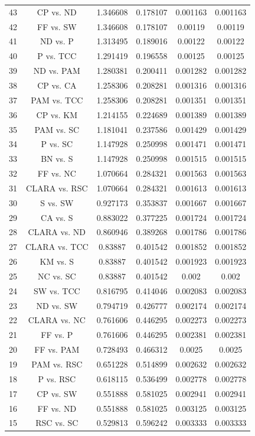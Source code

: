 \documentclass[a4paper,10pt]{article}
\begin{document}
\begin{landscape}
\begin{table}[!htp]
\begin{tabular}{cccccc}
43&CP vs. ND&1.346608&0.178107&0.001163&0.001163\\
42&FF vs. SW&1.346608&0.178107&0.00119&0.00119\\
41&ND vs. P&1.313495&0.189016&0.00122&0.00122\\
40&P vs. TCC&1.291419&0.196558&0.00125&0.00125\\
39&ND vs. PAM&1.280381&0.200411&0.001282&0.001282\\
38&CP vs. CA&1.258306&0.208281&0.001316&0.001316\\
37&PAM vs. TCC&1.258306&0.208281&0.001351&0.001351\\
36&CP vs. KM&1.214155&0.224689&0.001389&0.001389\\
35&PAM vs. SC&1.181041&0.237586&0.001429&0.001429\\
34&P vs. SC&1.147928&0.250998&0.001471&0.001471\\
33&BN vs. S&1.147928&0.250998&0.001515&0.001515\\
32&FF vs. NC&1.070664&0.284321&0.001563&0.001563\\
31&CLARA vs. RSC&1.070664&0.284321&0.001613&0.001613\\
30&S vs. SW&0.927173&0.353837&0.001667&0.001667\\
29&CA vs. S&0.883022&0.377225&0.001724&0.001724\\
28&CLARA vs. ND&0.860946&0.389268&0.001786&0.001786\\
27&CLARA vs. TCC&0.83887&0.401542&0.001852&0.001852\\
26&KM vs. S&0.83887&0.401542&0.001923&0.001923\\
25&NC vs. SC&0.83887&0.401542&0.002&0.002\\
24&SW vs. TCC&0.816795&0.414046&0.002083&0.002083\\
23&ND vs. SW&0.794719&0.426777&0.002174&0.002174\\
22&CLARA vs. NC&0.761606&0.446295&0.002273&0.002273\\
21&FF vs. P&0.761606&0.446295&0.002381&0.002381\\
20&FF vs. PAM&0.728493&0.466312&0.0025&0.0025\\
19&PAM vs. RSC&0.651228&0.514899&0.002632&0.002632\\
18&P vs. RSC&0.618115&0.536499&0.002778&0.002778\\
17&CP vs. SW&0.551888&0.581025&0.002941&0.002941\\
16&FF vs. ND&0.551888&0.581025&0.003125&0.003125\\
15&RSC vs. SC&0.529813&0.596242&0.003333&0.003333\\

\end{tabular}
\end{table}
\end{landscape}
\end{document}
